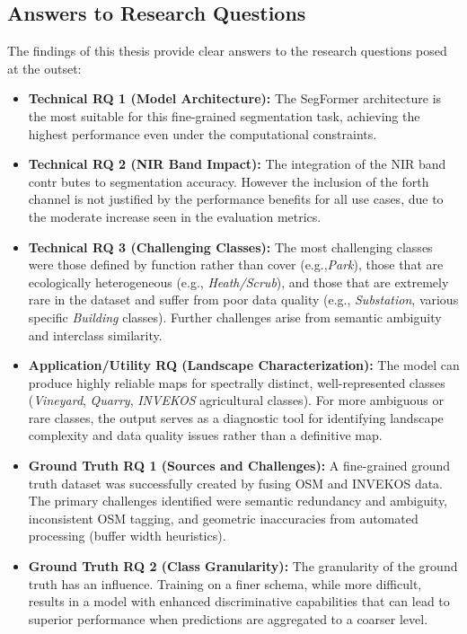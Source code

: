 \documentclass{report}
\begin{document}
\subsection{Answers to Research Questions}
The findings of this thesis provide clear answers to the research questions posed at the outset:
\begin{itemize}
    \item \textbf{Technical RQ 1 (Model Architecture):} The SegFormer architecture is the most suitable for this fine-grained segmentation task, achieving the highest performance even under the computational constraints.
    \item \textbf{Technical RQ 2 (NIR Band Impact):} The integration of the NIR band cont\textbf{}r butes to segmentation accuracy. However the inclusion of the forth channel is not justified by the performance benefits for all use cases, due to the moderate increase seen in the evaluation metrics.
    \item \textbf{Technical RQ 3 (Challenging Classes):} The most challenging classes were those defined by function rather than cover (e.g.,\textit{Park}), those that are ecologically heterogeneous (e.g., \textit{Heath/Scrub}), and those that are extremely rare in the dataset and suffer from poor data quality (e.g., \textit{Substation}, various specific \textit{Building} classes). Further challenges arise from semantic ambiguity and interclass similarity. 
    \item \textbf{Application/Utility RQ (Landscape Characterization):} The model can produce highly reliable maps for spectrally distinct, well-represented classes (\textit{Vineyard}, \textit{Quarry}, \textit{INVEKOS} agricultural classes). For more ambiguous or rare classes, the output serves as a diagnostic tool for identifying landscape complexity and data quality issues rather than a definitive map.
    \item \textbf{Ground Truth RQ 1 (Sources and Challenges):} A fine-grained ground truth dataset was successfully created by fusing OSM and INVEKOS data. The primary challenges identified were semantic redundancy and ambiguity, inconsistent OSM tagging, and geometric inaccuracies from automated processing (buffer width heuristics).
    \item \textbf{Ground Truth RQ 2 (Class Granularity):} The granularity of the ground truth has an influence. Training on a finer schema, while more difficult, results in a model with enhanced discriminative capabilities that can lead to superior performance when predictions are aggregated to a coarser level.
\end{itemize}
\end{document}
